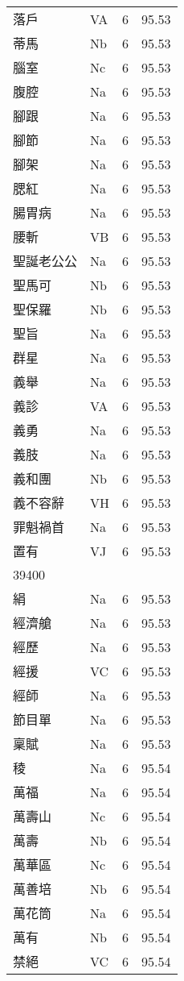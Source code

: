 \documentclass[twocolumn]{book}
\begin{document}
\begin{supertabular}{llrr}
落戶 & VA & 6 &  95.53\\
蒂馬 & Nb & 6 &  95.53\\
腦室 & Nc & 6 &  95.53\\
腹腔 & Na & 6 &  95.53\\
腳跟 & Na & 6 &  95.53\\
腳節 & Na & 6 &  95.53\\
腳架 & Na & 6 &  95.53\\
腮紅 & Na & 6 &  95.53\\
腸胃病 & Na & 6 &  95.53\\
腰斬 & VB & 6 &  95.53\\
聖誕老公公 & Na & 6 &  95.53\\
聖馬可 & Nb & 6 &  95.53\\
聖保羅 & Nb & 6 &  95.53\\
聖旨 & Na & 6 &  95.53\\
群星 & Na & 6 &  95.53\\
義舉 & Na & 6 &  95.53\\
義診 & VA & 6 &  95.53\\
義勇 & Na & 6 &  95.53\\
義肢 & Na & 6 &  95.53\\
義和團 & Nb & 6 &  95.53\\
義不容辭 & VH & 6 &  95.53\\
罪魁禍首 & Na & 6 &  95.53\\
置有 & VJ & 6 &  95.53\\
39400\\
絹 & Na & 6 &  95.53\\
經濟艙 & Na & 6 &  95.53\\
經歷 & Na & 6 &  95.53\\
經援 & VC & 6 &  95.53\\
經師 & Na & 6 &  95.53\\
節目單 & Na & 6 &  95.53\\
稟賦 & Na & 6 &  95.53\\
稜 & Na & 6 &  95.54\\
萬福 & Na & 6 &  95.54\\
萬壽山 & Nc & 6 &  95.54\\
萬壽 & Nb & 6 &  95.54\\
萬華區 & Nc & 6 &  95.54\\
萬善培 & Nb & 6 &  95.54\\
萬花筒 & Na & 6 &  95.54\\
萬有 & Nb & 6 &  95.54\\
禁絕 & VC & 6 &  95.54\\

\end{supertabular}
\end{document}

